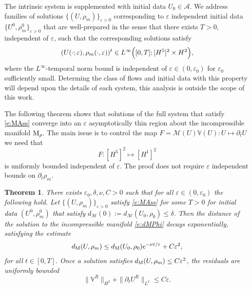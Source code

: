 \documentclass[11pt]{amsart}
\theoremstyle{plain}
\newcommand{\beq}{\begin{equation}}
\newcommand{\eeq}{\end{equation}}
\def\cA{{\mathcal A}}
\def\cM{{\mathcal M}}
\def\mbbV{\mathbb{V}}
\def\mrM{\textrm M}
\def\eps{\varepsilon}
\numberwithin{equation}{section}
\theoremstyle{plain}
\newtheorem{thm}{Theorem}
\begin{document}
The intrinsic system is supplemented with initial data $U_0\in\cA$. 
 We address families of solutions $\{(U,\rho_m)\}_{\eps>0}$ corresponding to $\eps$ independent initial data 
 $\{U^0,\rho_m^0\}_{\eps>0}$ that are well-prepared in the sense that there exists $T>0$, independent of $\eps$, such that the corresponding solutions satisfy
 \beq\label{e:MAss}(U(\cdot;\eps),\rho_m(\cdot,\eps))^t\in L^\infty\Bigl([0,T]; [H^{5}]^2\times H^{2}\Bigr),
 \eeq
 where the $L^\infty$-temporal norm bound is independent of $\eps\in(0,\eps_0)$ for $\eps_0$ sufficiently small. Determing the class of flows and initial data with this property will depend upon the details of each system, this analysis is outside the scope of this work.
 
The following theorem shows that solutions of the full system that  satisfy \eqref{e:MAss} converge into an $\eps$ asymptotically thin region about the incompressible manifold $\mrM_\rho.$
The main issue is to control the map $F=\cM(U)\mbbV(U):U\mapsto \partial_t U$ we need that
$$ F: [H^{5}]^2\mapsto [H^{1}]^2$$
is uniformly bounded independent of $\eps$. The proof does not require $\eps$ independent bounds on $\partial_t\rho_m.$ %

\begin{thm}
\label{t:ICM}
 There exists $\eps_0,\delta, \nu, C>0$ such that for all  $\eps\in (0,\eps_0)$ the following hold. 
 Let $\{(U,\rho_m)\}_{\eps>0}$ satisfy \eqref{e:MAss} for some $T>0$ for initial data $(U^0,\rho^0_m)$ that satisfy  $d_\cM(0):=d_\cM(U_0,\rho_0)\leq \delta$.  Then the distance of the solution to the incompressible manifold \eqref{e:dMPhi} decays exponentially, satisfying the estimate
\beq\label{e:IM_B1}
d_\mrM(U,\rho_m) \leq d_\mrM(U_0,\rho_0) e^{-\nu t/\eps } +C\eps^2,
\eeq
for all $t\in[0,T].$
Once a solution satisfies $d_\mrM(U,\rho_m)\leq C\eps^2$, the  residuals are uniformly bounded
\beq\label{e:Resid_bnd}
\|\mbbV^R\|_{H^{2}}+\|\partial_t U^R\|_{L^2} \leq C \eps.
\eeq
\end{thm}
\end{document}
